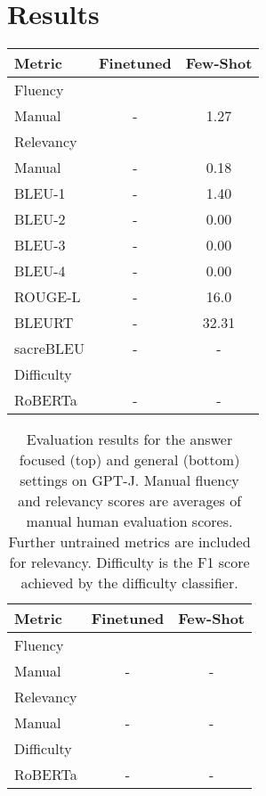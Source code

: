 \documentclass[11pt]{article}
\begin{document}
\section{Results}

\begin{table}[h]
\centering
\begin{tabular}{lcc}
\hline
\textbf{Metric} & \textbf{Finetuned} & \textbf{Few-Shot}\\
\hline
Fluency & & \\ 
\hspace{0.5cm} Manual & - & 1.27 \\
Relevancy & & \\
\hspace{0.5cm} Manual & - & 0.18 \\
\hspace{0.5cm} BLEU-1 & - & 1.40 \\
\hspace{0.5cm} BLEU-2 & - & 0.00 \\
\hspace{0.5cm} BLEU-3 & - & 0.00 \\
\hspace{0.5cm} BLEU-4 & - & 0.00 \\
\hspace{0.5cm} ROUGE-L & - & 16.0 \\
\hspace{0.5cm} BLEURT & - & 32.31 \\
\hspace{0.5cm} sacreBLEU & - & - \\
Difficulty & & \\
\hspace{0.5cm} RoBERTa & - & - \\
\hline
\end{tabular}
\end{table}

\begin{table}[h]
\centering
\begin{tabular}{lcc}
\hline
\textbf{Metric} & \textbf{Finetuned} & \textbf{Few-Shot}\\
\hline
Fluency & & \\ 
\hspace{0.5cm} Manual & - & - \\
Relevancy & & \\
\hspace{0.5cm} Manual & - & - \\
Difficulty & & \\
\hspace{0.5cm} RoBERTa & - & - \\
\hline
\end{tabular}
\caption{\label{citation-guide}
Evaluation results for the answer focused (top) and general (bottom) settings on GPT-J. Manual fluency and relevancy scores are averages of manual human evaluation scores. Further untrained metrics are included for relevancy. Difficulty is the F1 score achieved by the difficulty classifier.  
}
\end{table}
\end{document}
